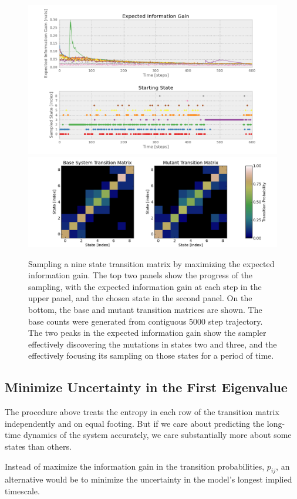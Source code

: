 \documentclass[twocolumn,floatfix,nofootinbib,aps]{revtex4-1}
\begin{document}
\begin{figure}[h]
\centering
\includegraphics[width=7in]{code/9x9graph/plots/information_gain.png}
\includegraphics[width=7in]{code/9x9graph/plots/transition_matricies.png}
\caption{Sampling a nine state transition matrix by maximizing the expected information gain. The top two panels show the progress of the sampling, with the expected information gain at each step in the upper panel, and the chosen state in the second panel. On the bottom, the base and mutant transition matrices are shown. The base counts were generated from contiguous 5000 step trajectory. The two peaks in the expected information gain show the sampler effectively discovering the mutations in states two and three, and the effectively focusing its sampling on those states for a period of time.}
\end{figure}

\subsection{Minimize Uncertainty in the First Eigenvalue}

The procedure above treats the entropy in each row of the transition matrix independently and on equal footing. But if we care about predicting the long-time dynamics of the system accurately, we care substantially more about some states than others.

Instead of maximize the information gain in the transition probabilities, $p_{ij}$, an alternative would be to minimize the uncertainty in the model's longest implied timescale.
\end{document}
